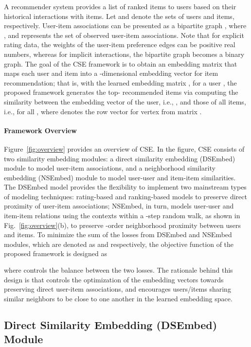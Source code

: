 \documentclass[sigconf,anonymous=false]{acmart}
\begin{document}
A recommender system provides a list of ranked items to users based on
their historical interactions with items.
Let  and  denote the sets of users and items, respectively.
User-item associations can be presented as a bipartite graph , where
, and  represents the set of observed
user-item associations.
Note that for explicit rating data, the weights of the user-item preference
edges can be positive real numbers, whereas for implicit interactions, the
bipartite graph becomes a binary graph.
The goal of the CSE framework is to obtain an embedding matrix
 that maps each user and item into a
-dimensional embedding vector for item recommendation;
that is, with the learned embedding matrix , for a user , the
proposed framework generates the top- recommended items via computing the
similarity between the embedding vector of the user, i.e., , and
those of all items, i.e.,  for all , where 
denotes the row vector for vertex  from matrix . 
\paragraph{Framework Overview}

Figure~\ref{fig:overview} provides an overview of CSE.
In the figure, CSE consists of two similarity embedding modules: a direct
similarity embedding ({DSEmbed}) module to model user-item associations, and a
neighborhood similarity embedding ({NSEmbed}) module to model
user-user and item-item similarities.
The {DSEmbed} model provides the flexibility to implement two mainstream types
of modeling techniques: rating-based and ranking-based models to preserve
direct proximity of user-item associations; {NSEmbed}, in turn, models
user-user and item-item relations using the contexts within a -step random
walk, as shown in Fig.~\ref{fig:overview}(b), to preserve -order
neighborhood proximity between users and items.
To minimize the sum of the losses from DSEmbed and NSEmbed modules, which
are denoted as  and  respectively, the
objective function of the proposed framework is designed as

where  controls the balance between the two losses.
The rationale behind this design is that  controls the
optimization of the embedding vectors towards preserving direct user-item
associations, and  encourages users/items sharing similar
neighbors to be close to one another in the learned embedding space.


\subsection{Direct Similarity Embedding (DSEmbed) Module}
\end{document}

